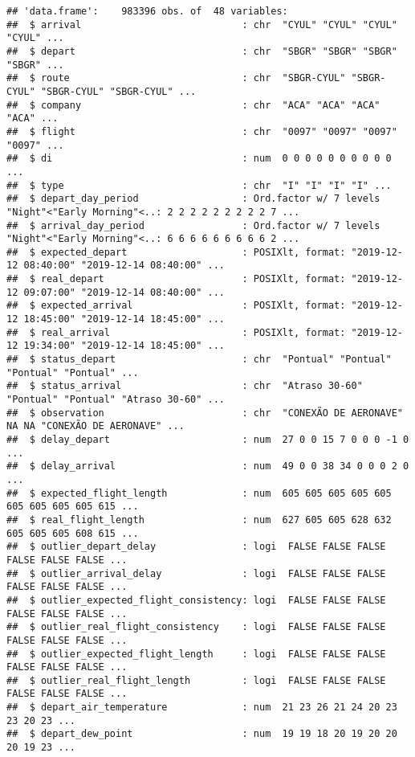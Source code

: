 \documentclass[
]{article}
\begin{document}
\begin{verbatim}
## 'data.frame':    983396 obs. of  48 variables:
##  $ arrival                            : chr  "CYUL" "CYUL" "CYUL" "CYUL" ...
##  $ depart                             : chr  "SBGR" "SBGR" "SBGR" "SBGR" ...
##  $ route                              : chr  "SBGR-CYUL" "SBGR-CYUL" "SBGR-CYUL" "SBGR-CYUL" ...
##  $ company                            : chr  "ACA" "ACA" "ACA" "ACA" ...
##  $ flight                             : chr  "0097" "0097" "0097" "0097" ...
##  $ di                                 : num  0 0 0 0 0 0 0 0 0 0 ...
##  $ type                               : chr  "I" "I" "I" "I" ...
##  $ depart_day_period                  : Ord.factor w/ 7 levels "Night"<"Early Morning"<..: 2 2 2 2 2 2 2 2 2 7 ...
##  $ arrival_day_period                 : Ord.factor w/ 7 levels "Night"<"Early Morning"<..: 6 6 6 6 6 6 6 6 6 2 ...
##  $ expected_depart                    : POSIXlt, format: "2019-12-12 08:40:00" "2019-12-14 08:40:00" ...
##  $ real_depart                        : POSIXlt, format: "2019-12-12 09:07:00" "2019-12-14 08:40:00" ...
##  $ expected_arrival                   : POSIXlt, format: "2019-12-12 18:45:00" "2019-12-14 18:45:00" ...
##  $ real_arrival                       : POSIXlt, format: "2019-12-12 19:34:00" "2019-12-14 18:45:00" ...
##  $ status_depart                      : chr  "Pontual" "Pontual" "Pontual" "Pontual" ...
##  $ status_arrival                     : chr  "Atraso 30-60" "Pontual" "Pontual" "Atraso 30-60" ...
##  $ observation                        : chr  "CONEXÃO DE AERONAVE" NA NA "CONEXÃO DE AERONAVE" ...
##  $ delay_depart                       : num  27 0 0 15 7 0 0 0 -1 0 ...
##  $ delay_arrival                      : num  49 0 0 38 34 0 0 0 2 0 ...
##  $ expected_flight_length             : num  605 605 605 605 605 605 605 605 605 615 ...
##  $ real_flight_length                 : num  627 605 605 628 632 605 605 605 608 615 ...
##  $ outlier_depart_delay               : logi  FALSE FALSE FALSE FALSE FALSE FALSE ...
##  $ outlier_arrival_delay              : logi  FALSE FALSE FALSE FALSE FALSE FALSE ...
##  $ outlier_expected_flight_consistency: logi  FALSE FALSE FALSE FALSE FALSE FALSE ...
##  $ outlier_real_flight_consistency    : logi  FALSE FALSE FALSE FALSE FALSE FALSE ...
##  $ outlier_expected_flight_length     : logi  FALSE FALSE FALSE FALSE FALSE FALSE ...
##  $ outlier_real_flight_length         : logi  FALSE FALSE FALSE FALSE FALSE FALSE ...
##  $ depart_air_temperature             : num  21 23 26 21 24 20 23 23 20 23 ...
##  $ depart_dew_point                   : num  19 19 18 20 19 20 20 20 19 23 ...

\end{verbatim}
\end{document}
